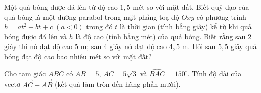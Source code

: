 \begin{ex}%
Một quả bóng được đá lên từ độ cao $1{,}5$ mét so với mặt đất. Biết quỹ đạo của quả bóng là một đường parabol trong mặt phẳng toạ độ $Oxy$ có phương trình $h=at^{2} +bt+c\; \left(a<0\right)$ trong đó $t$ là thời gian (tính bằng giây) kể từ khi quả bóng được đá lên và $h$ là độ cao (tính bằng mét) của quả bóng. Biết rằng sau $2$ giây thì nó đạt độ cao $5$ m; sau $4$ giây nó đạt độ cao $4{,}5$ m. Hỏi sau $5{,}5$ giây quả bóng đạt độ cao bao nhiêu mét so với mặt đất?
\end{ex}

\begin{ex}%
Cho tam giác $ABC$ có $AB=5$, $AC=5\sqrt{3}$ và $\widehat{BAC}=150^\circ$. Tính độ dài của vectơ $\overrightarrow{AC}-\overrightarrow{AB}$ (kết quả làm tròn đến hàng phần mười).
\end{ex}

